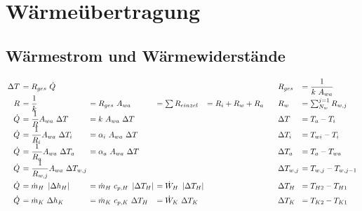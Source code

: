 \setcounter{section}{2}

\section{Wärmeübertragung}

\subsection{Wärmestrom und Wärmewiderstände}
	\setlength{\abovedisplayskip}{-20pt}
	\[ \arraycolsep=0.2em  \def\arraystretch{1.5}
	\begin{array}{r l l l l p{1em} l l}
		\Delta T & = R_{ges}\ \dot{Q}                          &                                         &                               &                   &  & R_{ges}        & = \dfrac{1}{k\ A_{wa}}     \\
		R        & = \dfrac{1}{k}                              & = R_{ges}\ A_{wa}                       & = \sum R_{einzel}             & = R_i + R_w + R_a &  & R_w            & = \sum_{N_w}^{j=1} R_{w,j} \\
		\dot{Q}  & = \dfrac{1}{R} A_{wa}\   \Delta T           & = k\ A_{wa}\ \Delta T                   &                               &                   &  & \Delta T       & = T_a - T_i                \\
		\dot{Q}  & = \dfrac{1}{R_i} A_{wa}\ \Delta T_i         & = \alpha_i\ A_{wa}\ \Delta T            &                               &                   &  & \Delta T_i     & = T_{wi} - T_i             \\
		\dot{Q}  & = \dfrac{1}{R_a} A_{wa}\ \Delta T_a         & = \alpha_a\ A_{wa}\ \Delta T            &                               &                   &  & \Delta T_a     & = T_a - T_{wa}             \\
		\dot{Q}  & = \dfrac{1}{R_{w,j}} A_{wa}\ \Delta T_{w,j} &                                         &                               &                   &  & \Delta T_{w,j} & = T_{w,j} - T_{w,j-1}      \\
		\dot{Q}  & = \dot{m}_H\ \abs{\Delta h_H}               & =  \dot{m}_H\ c_{p,H}\ \abs{\Delta T_H} & = \dot{W}_H\ \abs{\Delta T_H} &                   &  & \Delta T_H     & = T_{H2} - T_{H1}          \\
		\dot{Q}  & = \dot{m}_K\ \Delta h_K                     & =  \dot{m}_K\ c_{p,K}\ \Delta T_H       & = \dot{W}_K\ \Delta T_K       &                   &  & \Delta T_K     & = T_{K2} - T_{K1}
	\end{array} \]

